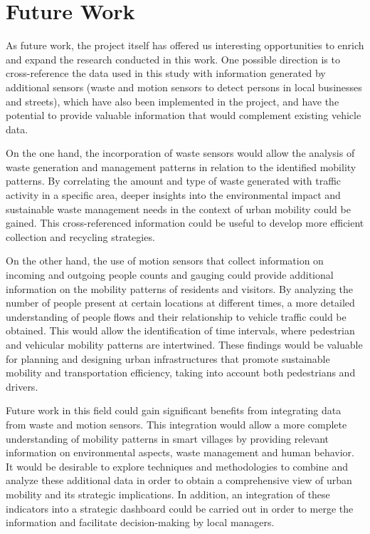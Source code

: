 \section{Future Work}

As future work, the project itself has offered us interesting opportunities to enrich and expand the research conducted in this work. One possible direction is to cross-reference the data used in this study with information generated by additional sensors (waste and motion sensors to detect persons in local businesses and streets), which have also been implemented in the project, and have the potential to provide valuable information that would complement existing vehicle data.

On the one hand, the incorporation of waste sensors would allow the analysis of waste generation and management patterns in relation to the identified mobility patterns. By correlating the amount and type of waste generated with traffic activity in a specific area, deeper insights into the environmental impact and sustainable waste management needs in the context of urban mobility could be gained. This cross-referenced information could be useful to develop more efficient collection and recycling strategies.

On the other hand, the use of motion sensors that collect information on incoming and outgoing people counts and gauging could provide additional information on the mobility patterns of residents and visitors. By analyzing the number of people present at certain locations at different times, a more detailed understanding of people flows and their relationship to vehicle traffic could be obtained. This would allow the identification of time intervals, where pedestrian and vehicular mobility patterns are intertwined. These findings would be valuable for planning and designing urban infrastructures that promote sustainable mobility and transportation efficiency, taking into account both pedestrians and drivers.

Future work in this field could gain significant benefits from integrating data from waste and motion sensors. This integration would allow a more complete understanding of mobility patterns in smart villages by providing relevant information on environmental aspects, waste management and human behavior. It would be desirable to explore techniques and methodologies to combine and analyze these additional data in order to obtain a comprehensive view of urban mobility and its strategic implications. In addition, an integration of these indicators into a strategic dashboard could be carried out in order to merge the information and facilitate decision-making by local managers.